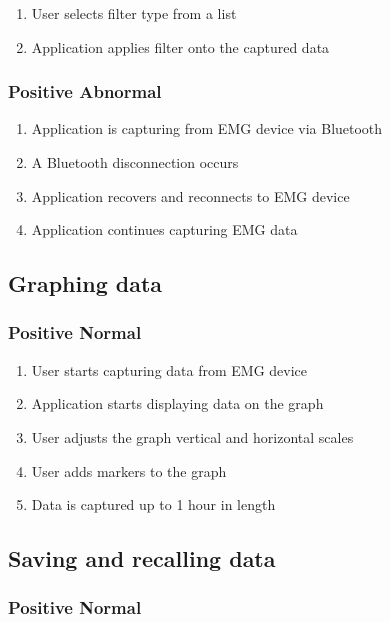 \documentclass[12pt,a4paper]{article}
\begin{document}
\begin{enumerate}
	\item User selects filter type from a list
	\item Application applies filter onto the captured data
\end{enumerate}

\subsubsection{Positive Abnormal}

\begin{enumerate}
	\item Application is capturing from EMG device via Bluetooth
	\item A Bluetooth disconnection occurs
	\item Application recovers and reconnects to EMG device
	\item Application continues capturing EMG data
\end{enumerate}

\subsection{Graphing data}

\subsubsection{Positive Normal}

\begin{enumerate}
	\item User starts capturing data from EMG device
	\item Application starts displaying data on the graph
	\item User adjusts the graph vertical and horizontal scales
	\item User adds markers to the graph
	\item Data is captured up to 1 hour in length
\end{enumerate}

\subsection{Saving and recalling data}

\subsubsection{Positive Normal}
\end{document}
